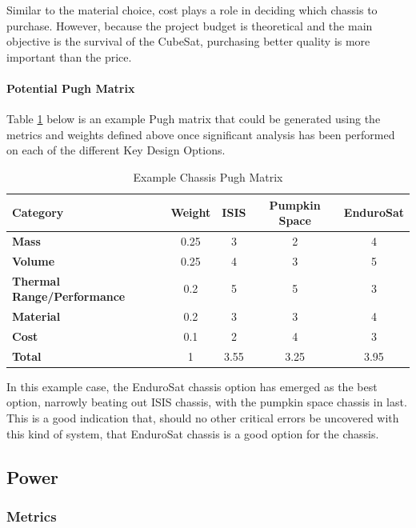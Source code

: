 Similar to the material choice, cost plays a role in deciding which chassis to purchase. However, because the project budget is theoretical and the main objective is the survival of the CubeSat, purchasing better quality is more important than the price. 

\paragraph{Potential Pugh Matrix}

Table \ref{tbl:chassis_Pugh} below is an example Pugh matrix that could be generated using the metrics and weights defined above once significant analysis has been performed on each of the different Key Design Options. 
\begin{table}[H]
\centering
\begin{tabular}{|l|c|c|c|c|} 
\hline
    \textbf{Category} & \textbf{Weight} & \textbf{ISIS} & \textbf{Pumpkin Space} & \textbf{EnduroSat}
    \\
\hline
    \textbf{Mass} & 0.25 & 3 & 2 & 4
    \\
\hline
    \textbf{Volume} & 0.25 & 4 & 3 & 5
    \\
\hline
    \textbf{Thermal Range/Performance} & 0.2 & 5 & 5 & 3
    \\
\hline
    \textbf{Material} & 0.2 & 3 & 3 & 4
    \\
\hline
    \textbf{Cost} & 0.1 & 2 & 4 & 3
    \\
\hline
    \textbf{Total} & 1 & 3.55 & 3.25 & 3.95
    \\
\hline
\end{tabular}
\caption{Example Chassis Pugh Matrix }
\label{tbl:chassis_Pugh}
\end{table}

In this example case, the EnduroSat chassis option has emerged as the best option, narrowly beating out ISIS chassis, with the pumpkin space chassis in last. This is a good indication that, should no other critical errors be uncovered with this kind of system, that EnduroSat chassis is a good option for the chassis.

\subsection{Power}
\subsubsection{Metrics}
